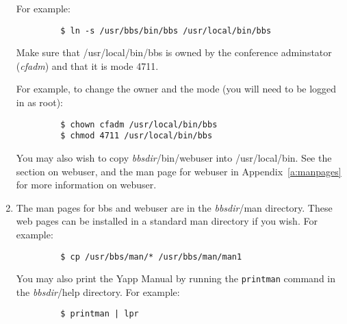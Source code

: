 \documentclass[twoside]{report}
\begin{document}
\begin{enumerate}
         For example:
         \begin{verbatim}
         $ ln -s /usr/bbs/bin/bbs /usr/local/bin/bbs
         \end{verbatim}
         \vspace{-12pt}
   
         Make sure that /usr/local/bin/bbs is owned by the conference 
         adminstator ({\em cfadm}) and that it is mode 4711.
   
         For example, to change the owner and the mode (you will need to be
         logged in as root):
         \begin{verbatim}
         $ chown cfadm /usr/local/bin/bbs
         $ chmod 4711 /usr/local/bin/bbs
         \end{verbatim}
         \vspace{-12pt}
   
         You may also wish to copy {\em bbsdir}/bin/webuser into /usr/local/bin.  
         See the section on webuser, and the man page for webuser in
         Appendix~\ref{a:manpages} for more information on webuser.
   
      \item The man pages for bbs and webuser are in the {\em bbsdir}/man 
         directory.  These web pages can be installed in a standard man 
         directory if you wish.  For example:
         \begin{verbatim}
         $ cp /usr/bbs/man/* /usr/bbs/man/man1
         \end{verbatim}
         \vspace{-12pt}
   
         You may also print the Yapp Manual by running the 
         {\tt printman} command in the {\em bbsdir}/help 
         directory.  For example:
         \begin{verbatim}
         $ printman | lpr
         \end{verbatim}
         \vspace{-12pt}
      \end{enumerate}
   
\end{document}
